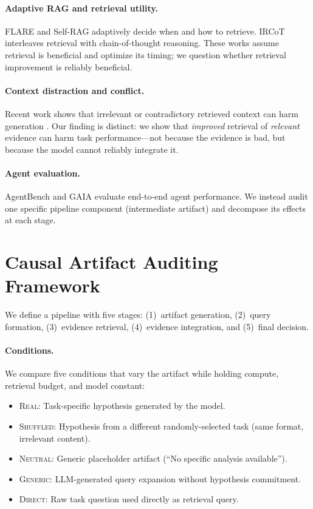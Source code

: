 \documentclass{article}
\begin{document}
\paragraph{Adaptive RAG and retrieval utility.}
FLARE \citep{flare2023} and Self-RAG \citep{selfrag2024} adaptively decide when and how to retrieve. IRCoT \citep{ircot2023} interleaves retrieval with chain-of-thought reasoning. These works assume retrieval is beneficial and optimize its timing; we question whether retrieval improvement is reliably beneficial.

\paragraph{Context distraction and conflict.}
Recent work shows that irrelevant or contradictory retrieved context can harm generation \citep{notrust2024,lostmiddle2024}. Our finding is distinct: we show that \emph{improved} retrieval of \emph{relevant} evidence can harm task performance---not because the evidence is bad, but because the model cannot reliably integrate it.

\paragraph{Agent evaluation.}
AgentBench \citep{agentbench2024} and GAIA \citep{gaia2024} evaluate end-to-end agent performance. We instead audit one specific pipeline component (intermediate artifact) and decompose its effects at each stage.

\section{Causal Artifact Auditing Framework}
\label{sec:method}

We define a pipeline with five stages: (1)~artifact generation, (2)~query formation, (3)~evidence retrieval, (4)~evidence integration, and (5)~final decision.

\paragraph{Conditions.}
We compare five conditions that vary the artifact while holding compute, retrieval budget, and model constant:

\begin{itemize}
    \item \textsc{Real}: Task-specific hypothesis generated by the model.
    \item \textsc{Shuffled}: Hypothesis from a different randomly-selected task (same format, irrelevant content).
    \item \textsc{Neutral}: Generic placeholder artifact (``No specific analysis available'').
    \item \textsc{Generic}: LLM-generated query expansion without hypothesis commitment.
    \item \textsc{Direct}: Raw task question used directly as retrieval query.
\end{itemize}
\end{document}
